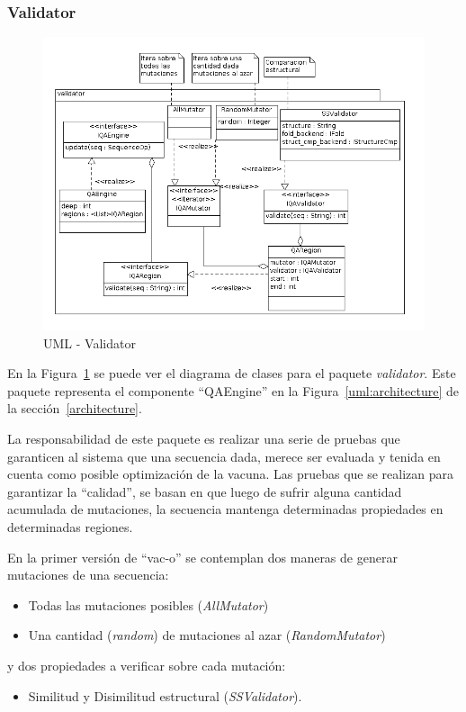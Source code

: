   \subsubsection{Validator}
    \begin{figure}
      \centering
      \includegraphics[scale=0.5]{lld-validator.png}  
      \caption{UML - Validator}
      \label{uml:lld-validator}
    \end{figure}

  En la Figura~\ref{uml:lld-validator} se puede ver el diagrama de clases
para el paquete \textit{validator}. Este paquete representa el componente
``QAEngine'' en la Figura~\ref{uml:architecture} de la
secci\'on~\ref{architecture}.

  La responsabilidad de este paquete es realizar una serie de pruebas que
garanticen al sistema que una secuencia dada, merece ser evaluada y tenida en
cuenta como posible optimizaci\'on de la vacuna. Las pruebas que se realizan
para garantizar la ``calidad'', se basan en que luego de sufrir alguna cantidad
acumulada de mutaciones, la secuencia mantenga determinadas propiedades en
determinadas regiones.

  En la primer versi\'on de ``vac-o'' se contemplan dos maneras de generar
mutaciones de una secuencia:
    \begin{itemize}
     \item Todas las mutaciones posibles (\textit{AllMutator})
     \item Una cantidad (\textit{random}) de mutaciones al azar
(\textit{RandomMutator})
    \end{itemize}
y dos propiedades a verificar sobre cada mutaci\'on:
    \begin{itemize}
     \item Similitud y Disimilitud estructural (\textit{SSValidator}).
    \end{itemize}

